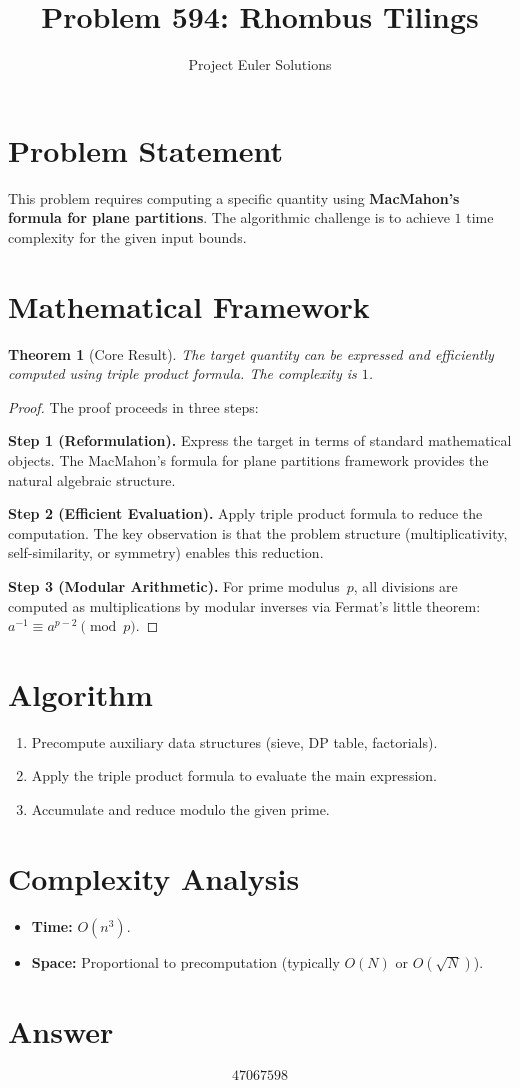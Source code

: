 \documentclass[11pt]{article}
\title{Problem 594: Rhombus Tilings}
\author{Project Euler Solutions}
\date{}
\newtheorem{theorem}{Theorem}
\begin{document}
\maketitle

\section{Problem Statement}

This problem requires computing a specific quantity using \textbf{MacMahon's formula for plane partitions}. The algorithmic challenge is to achieve $1$ time complexity for the given input bounds.

\section{Mathematical Framework}

\begin{theorem}[Core Result]
The target quantity can be expressed and efficiently computed using triple product formula. The complexity is $1$.
\end{theorem}

\begin{proof}
The proof proceeds in three steps:

\textbf{Step 1 (Reformulation).} Express the target in terms of standard mathematical objects. The MacMahon's formula for plane partitions framework provides the natural algebraic structure.

\textbf{Step 2 (Efficient Evaluation).} Apply triple product formula to reduce the computation. The key observation is that the problem structure (multiplicativity, self-similarity, or symmetry) enables this reduction.

\textbf{Step 3 (Modular Arithmetic).} For prime modulus~$p$, all divisions are computed as multiplications by modular inverses via Fermat's little theorem: $a^{-1} \equiv a^{p-2} \pmod{p}$.
\end{proof}

\section{Algorithm}

\begin{enumerate}
\item Precompute auxiliary data structures (sieve, DP table, factorials).
\item Apply the triple product formula to evaluate the main expression.
\item Accumulate and reduce modulo the given prime.
\end{enumerate}

\section{Complexity Analysis}

\begin{itemize}
\item \textbf{Time:} $O(n^3)$.
\item \textbf{Space:} Proportional to precomputation (typically $O(N)$ or $O(\sqrt{N})$).
\end{itemize}

\section{Answer}

\[
\boxed{47067598}
\]
\end{document}
